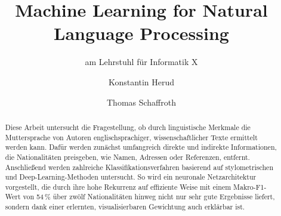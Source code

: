 \documentclass[bachelor,german]{info1thesis}
\title{Machine Learning for Natural Language Processing} %
\subtitle{am Lehrstuhl für Informatik X}
\author{Konstantin Herud\and Thomas Schaffroth} %
\begin{document}

\begin{abstract}
Diese Arbeit untersucht die Fragestellung, ob durch linguistische Merkmale die Muttersprache von Autoren englischsprachiger, wissenschaftlicher Texte ermittelt werden kann. Dafür werden zunächst umfangreich direkte und indirekte Informationen, die Nationalitäten preisgeben, wie Namen, Adressen oder Referenzen, entfernt. Anschließend werden zahlreiche Klassifikationsverfahren basierend auf stylometrischen und Deep-Learning-Methoden untersucht. So wird ein neuronale Netzarchitektur vorgestellt, die durch ihre hohe Rekurrenz auf effiziente Weise mit einem Makro-F1-Wert von 54\,\% über zwölf Nationalitäten hinweg nicht nur sehr gute Ergebnisse liefert, sondern dank einer erlernten, visualisierbaren Gewichtung auch erklärbar ist.
\end{abstract}

\thesistableofcontents
\end{document}
